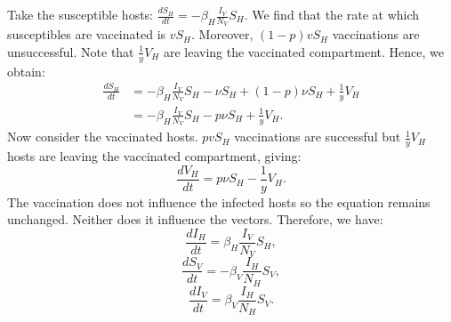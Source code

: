 Take the susceptible hosts: $\frac{dS_H}{dt} = - \beta_{H} \frac{I_V}{N_V} S_H$. We find that the rate at which susceptibles are vaccinated is $vS_H$. Moreover, $(1-p)vS_H$ vaccinations are unsuccessful. Note that $\frac{1}{y} V_H$ are leaving the vaccinated compartment. Hence, we obtain:
\begin{equation}
\begin{aligned}
\frac{dS_H}{dt} 
    &= - \beta_{H} \frac{I_V}{N_V} S_H - \nu S_H + (1 - p)\nu S_H + \frac{1}{y} V_H \\
    &= - \beta_{H} \frac{I_V}{N_V} S_H - p \nu S_H + \frac{1}{y} V_H .
\end{aligned}
\end{equation}
Now consider the vaccinated hosts. $pvS_H$ vaccinations are successful but $\frac{1}{y} V_H$ hosts are leaving the vaccinated compartment, giving:
\begin{equation}
\frac{dV_H}{dt} = p \nu S_H - \frac{1}{y} V_H.
\end{equation}
The vaccination does not influence the infected hosts so the equation remains unchanged. Neither does it influence the vectors. Therefore, we have:
\begin{equation}
\frac{dI_H}{dt} = \beta_{H} \frac{I_V}{N_V} S_H,
\end{equation}
\begin{equation}
\frac{dS_V}{dt} = - \beta_{V} \frac{I_H}{N_H} S_V,
\end{equation}
\begin{equation}
\frac{dI_V}{dt} = \beta_{V} \frac{I_H}{N_H} S_V.
\end{equation}




